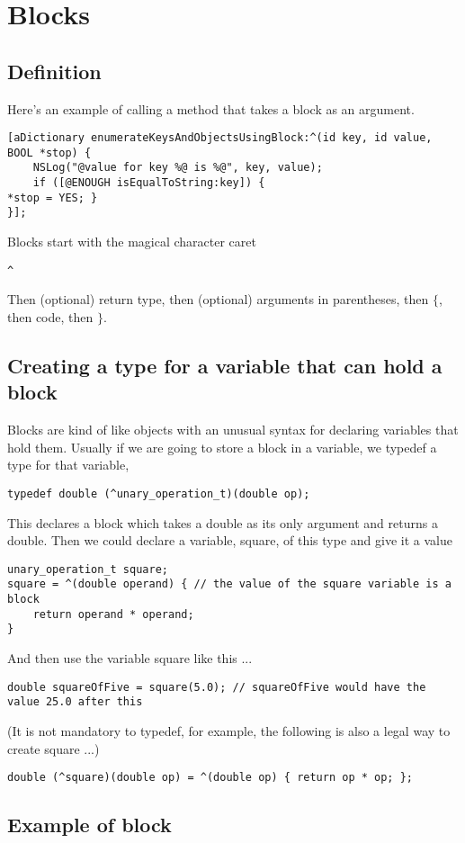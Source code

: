\documentclass[12pt]{article}
\begin{document}
\section{Blocks}
\subsection{Definition}
Here's an example of calling a method that takes a block as an argument.
\begin{lstlisting}
[aDictionary enumerateKeysAndObjectsUsingBlock:^(id key, id value, BOOL *stop) {
    NSLog("@value for key %@ is %@", key, value);
    if ([@ENOUGH isEqualToString:key]) {
*stop = YES; }
}];
\end{lstlisting}
Blocks start with the magical character caret 
\begin{lstlisting}
^
\end{lstlisting}
Then (optional) return type, then (optional) arguments in parentheses, then $\{$, then code, then $\}$.
\subsection{Creating a type for a variable that can hold a block}
Blocks are kind of like objects with an unusual syntax for declaring variables that hold them. Usually if we are going to store a block in a variable, we typedef a type for that variable, 
\begin{lstlisting}
typedef double (^unary_operation_t)(double op);
\end{lstlisting}
This declares a block which takes a double as its only argument and returns a double. Then we could declare a variable, square, of this type and give it a value
\begin{lstlisting}
unary_operation_t square;
square = ^(double operand) { // the value of the square variable is a block
    return operand * operand;
}
\end{lstlisting}
And then use the variable square like this ...
\begin{lstlisting}
double squareOfFive = square(5.0); // squareOfFive would have the value 25.0 after this
\end{lstlisting}
(It is not mandatory to typedef, for example, the following is also a legal way to create square ...)
\begin{lstlisting}
double (^square)(double op) = ^(double op) { return op * op; };
\end{lstlisting}

\subsection{Example of block}
\end{document}
